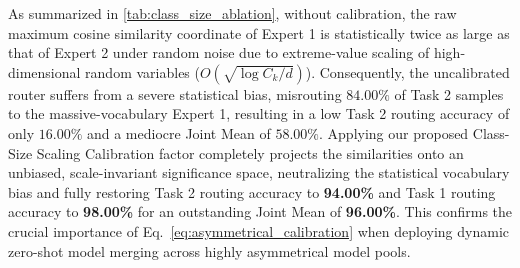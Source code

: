 \begin{table}[h]
\caption{Ablation of Class-Size Scaling Calibration (Eq.~\ref{eq:asymmetrical_calibration}) under highly asymmetrical output spaces ($C_1 = 32,000$ next-token head vs. $C_2 = 10$ classification head, feature dimension $d=192$). Without calibration, statistical max cosine similarity bias severely over-routes Task 2 samples to Task 1. Normalizing raw similarities by their expected random-chance maximum ($O(\sqrt{\log C_k / d})$) perfectly restores scale-invariant routing.}
\label{tab:class_size_ablation}
\vskip 0.1in
\begin{center}
\begin{small}
\end{small}
\end{center}
\vskip -0.1in
\end{table}

As summarized in \cref{tab:class_size_ablation}, without calibration, the raw maximum cosine similarity coordinate of Expert 1 is statistically twice as large as that of Expert 2 under random noise due to extreme-value scaling of high-dimensional random variables ($O(\sqrt{\log C_k / d})$). Consequently, the uncalibrated router suffers from a severe statistical bias, misrouting $84.00\%$ of Task 2 samples to the massive-vocabulary Expert 1, resulting in a low Task 2 routing accuracy of only $16.00\%$ and a mediocre Joint Mean of $58.00\%$. Applying our proposed Class-Size Scaling Calibration factor completely projects the similarities onto an unbiased, scale-invariant significance space, neutralizing the statistical vocabulary bias and fully restoring Task 2 routing accuracy to \textbf{94.00\%} and Task 1 routing accuracy to \textbf{98.00\%} for an outstanding Joint Mean of \textbf{96.00\%}. This confirms the crucial importance of Eq.~\ref{eq:asymmetrical_calibration} when deploying dynamic zero-shot model merging across highly asymmetrical model pools.

